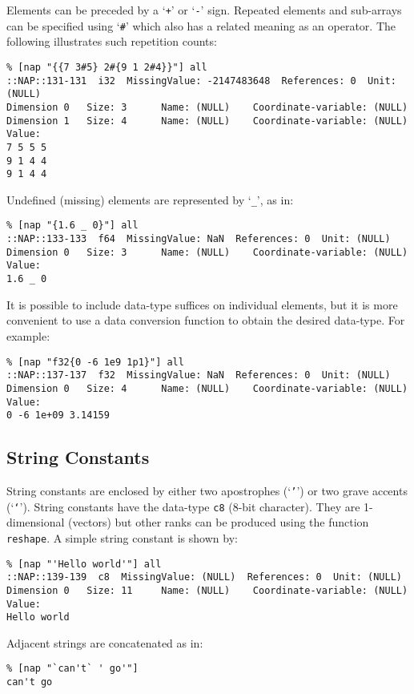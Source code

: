     

Elements can be preceded by a `\texttt{+}'
    or `\texttt{-}' sign. Repeated elements and sub-arrays can be
    specified using `\texttt{\#}' which also has a related meaning as an
    operator. The following illustrates such repetition counts:
    \begin{verbatim}
% [nap "{{7 3#5} 2#{9 1 2#4}}"] all
::NAP::131-131  i32  MissingValue: -2147483648  References: 0  Unit: (NULL)
Dimension 0   Size: 3      Name: (NULL)    Coordinate-variable: (NULL)
Dimension 1   Size: 4      Name: (NULL)    Coordinate-variable: (NULL)
Value:
7 5 5 5
9 1 4 4
9 1 4 4
\end{verbatim}

    

Undefined (missing) elements are represented by `\texttt{\_}', as in:
    \begin{verbatim}
% [nap "{1.6 _ 0}"] all
::NAP::133-133  f64  MissingValue: NaN  References: 0  Unit: (NULL)
Dimension 0   Size: 3      Name: (NULL)    Coordinate-variable: (NULL)
Value:
1.6 _ 0
\end{verbatim}

    

It is possible to include data-type suffices on individual
    elements, but it is more convenient to use a data conversion
    function to obtain the desired data-type. For example:
    \begin{verbatim}
% [nap "f32{0 -6 1e9 1p1}"] all
::NAP::137-137  f32  MissingValue: NaN  References: 0  Unit: (NULL)
Dimension 0   Size: 4      Name: (NULL)    Coordinate-variable: (NULL)
Value:
0 -6 1e+09 3.14159
\end{verbatim}

\subsection{String Constants}
      \label{const-String-Constants}

String constants are enclosed by either two apostrophes
    (`\texttt{'}') or two grave accents
    (`\texttt{`}'). String constants have the data-type 
    \texttt{c8} (8-bit character). They are 1-dimensional (vectors)
    but other ranks can be produced using the function 
    \texttt{reshape}. A simple string constant is shown by:
    \begin{verbatim}
% [nap "'Hello world'"] all
::NAP::139-139  c8  MissingValue: (NULL)  References: 0  Unit: (NULL)
Dimension 0   Size: 11     Name: (NULL)    Coordinate-variable: (NULL)
Value:
Hello world
\end{verbatim}

    

Adjacent strings are concatenated as in:
    \begin{verbatim}
% [nap "`can't` ' go'"]
can't go
\end{verbatim}

